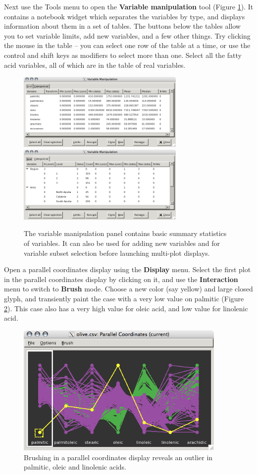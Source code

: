 \documentclass[11pt]{article}
\def\Widget#1{\textbf{#1}}
\begin{document}
Next use the Tools menu to open the \Widget{Variable manipulation} tool
(Figure \ref{fig4}).  It contains a notebook widget which separates
the variables by type, and displays information about them in a set
of tables.  The buttons below the tables allow you to set variable
limits, add new variables, and a few other things.  Try clicking the
mouse in the table -- you can select one row of the table at a time,
or use the control and shift keys as modifiers to select more than one.
Select all the fatty acid variables, all of which are in the table
of real variables.

\begin{figure}[htp]
\centerline{\includegraphics[width=3.2in]{Figures/olive-var1.png}
\includegraphics[width=3.2in]{Figures/olive-var2.png}}
\caption{The variable manipulation panel contains basic summary 
statistics of variables. It can also be used for adding new variables
and for variable subset selection before launching multi-plot
displays.
}%
\label{fig4}
\end{figure}

Open a parallel coordinates display using the \Widget{Display} menu.
Select the first plot in the parallel coordinates display by
clicking on it, and use the \Widget{Interaction} menu to switch to 
\Widget{Brush} mode. Choose a new color (say yellow) and large closed glyph,
and transiently paint the case with a very low value on palmitic
(Figure \ref{fig7}). This case also has a very high value for oleic
acid, and low value for linolenic acid.

\begin{figure}[htp]
\centerline{\includegraphics[width=4in]{Figures/olive-par.png}}
\caption{Brushing in a parallel coordinates display reveals an outlier in 
palmitic, oleic and linolenic acids.}
\label{fig7}
\end{figure}
\end{document}
